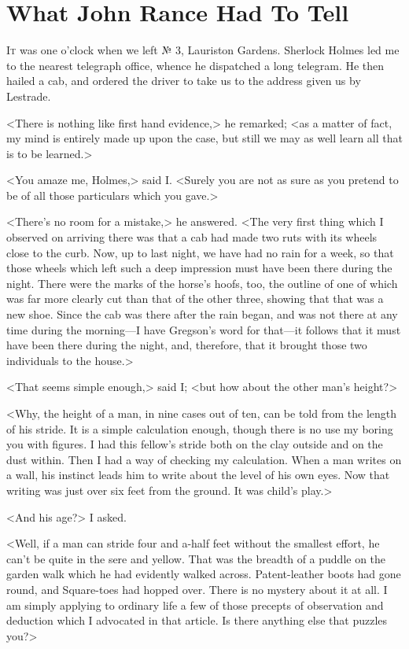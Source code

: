 \chapter{What John Rance Had To Tell}
	
\lettrine{I}{t} was one o'clock when we left № 3, Lauriston Gardens. Sherlock Holmes led me to the nearest telegraph office, whence he dispatched a long telegram. He then hailed a cab, and ordered the driver to take us to the address given us by Lestrade.

<There is nothing like first hand evidence,> he remarked; <as a matter of fact, my mind is entirely made up upon the case, but still we may as well learn all that is to be learned.>

<You amaze me, Holmes,> said I\@. <Surely you are not as sure as you pretend to be of all those particulars which you gave.>

<There's no room for a mistake,> he answered. <The very first thing which I observed on arriving there was that a cab had made two ruts with its wheels close to the curb. Now, up to last night, we have had no rain for a week, so that those wheels which left such a deep impression must have been there during the night. There were the marks of the horse's hoofs, too, the outline of one of which was far more clearly cut than that of the other three, showing that that was a new shoe. Since the cab was there after the rain began, and was not there at any time during the morning—I have Gregson's word for that—it follows that it must have been there during the night, and, therefore, that it brought those two individuals to the house.>

<That seems simple enough,> said I; <but how about the other man's height?>

<Why, the height of a man, in nine cases out of ten, can be told from the length of his stride. It is a simple calculation enough, though there is no use my boring you with figures. I had this fellow's stride both on the clay outside and on the dust within. Then I had a way of checking my calculation. When a man writes on a wall, his instinct leads him to write about the level of his own eyes. Now that writing was just over six feet from the ground. It was child's play.>

<And his age?> I asked.

<Well, if a man can stride four and a-half feet without the smallest effort, he can't be quite in the sere and yellow. That was the breadth of a puddle on the garden walk which he had evidently walked across. Patent-leather boots had gone round, and Square-toes had hopped over. There is no mystery about it at all. I am simply applying to ordinary life a few of those precepts of observation and deduction which I advocated in that article. Is there anything else that puzzles you?>

